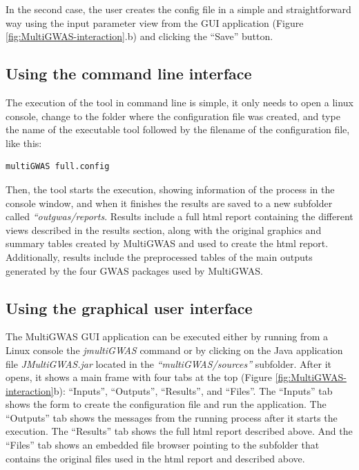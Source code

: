 \documentclass{article}
\begin{document}
In the second case, the user creates the config file in a simple and straightforward way using the input parameter view from the GUI application (Figure \ref{fig:MultiGWAS-interaction}.b) and clicking the ``Save'' button.


\subsection{Using the command line interface}

The execution of the tool in command line is simple, it only needs to open a linux console, change to the folder where the configuration file was created, and type the name of the executable tool followed by the filename of the configuration file, like this:

\begin{lstlisting}[language=bash,basicstyle={\small}]
multiGWAS full.config
\end{lstlisting}

Then, the tool starts the execution, showing information of the process in the console window, and when it finishes the results are saved to a new subfolder called \emph{``outgwas/reports}. Results include a full html report containing the different views described in the results section, along with the original graphics and summary tables created by MultiGWAS and used to create the html report. Additionally, results include the preprocessed tables of the main outputs generated by the four GWAS packages used by MultiGWAS.

\subsection{Using the graphical user interface}
The MultiGWAS GUI application can be executed either by running from a Linux console the \emph{jmultiGWAS} command or by clicking on the Java application file \emph{JMultiGWAS.jar} located in the \emph{``multiGWAS/sources''} subfolder. After it opens, it shows a main frame with four tabs at the top (Figure \ref{fig:MultiGWAS-interaction}b): ``Inputs'', ``Outputs'', ``Results'', and ``Files''. The ``Inputs'' tab shows the form to create the configuration file and run the application. The ``Outputs'' tab shows the messages from the running process after it starts the execution. The ``Results'' tab shows the full html report described above. And the ``Files'' tab shows an embedded file browser pointing to the subfolder that contains the original files used in the html report and described above.
\end{document}
